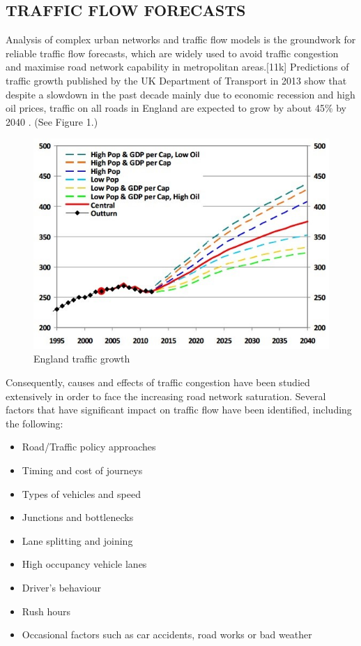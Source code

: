 \documentclass[11pt]{article}
\begin{document}
\subsection{TRAFFIC FLOW FORECASTS}

Analysis of complex urban networks and traffic flow models is the groundwork for reliable traffic flow forecasts, which are widely used to avoid traffic congestion and maximise road network capability in metropolitan areas.[11k] Predictions of traffic growth published by the UK Department of Transport in 2013 show that despite a slowdown in the past decade mainly due to economic recession and high oil prices, traffic on all roads in England are expected to grow by about 45\% by 2040 \cite{10j}. (See Figure 1.)

\begin{figure}[h]
\begin{center}
\includegraphics[scale=0.7]{england_traffic}
\caption{England traffic growth}
\end{center}
\end{figure}


Consequently, causes and effects of traffic congestion have been studied extensively in order to face the increasing road network saturation. Several factors that have significant impact on traffic flow have been identified, including the following: 
\begin{singlespace}
\begin{itemize}\itemsep0pt
\item Road/Traffic policy approaches
\item Timing and cost of journeys
\item Types of vehicles and speed
\item Junctions and bottlenecks
\item Lane splitting and joining
\item High occupancy vehicle lanes
\item Driver\textquoteright s behaviour
\item Rush hours
\item Occasional factors such as car accidents, road works or bad weather
\end{itemize}
\end{singlespace}
\end{document}
